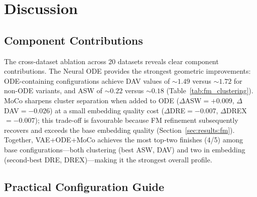 \documentclass[journal]{IEEEtran}
\begin{document}
\section{Discussion}
\label{sec:discussion}

\subsection{Component Contributions}
\label{sec:discussion:components}

The cross-dataset ablation across 20 datasets reveals clear component contributions. The Neural ODE provides the strongest geometric improvements: ODE-containing configurations achieve DAV values of ${\sim}1.49$ versus ${\sim}1.72$ for non-ODE variants, and ASW of ${\sim}0.22$ versus ${\sim}0.18$ (Table~\ref{tab:fm_clustering}). MoCo sharpens cluster separation when added to ODE ($\Delta$ASW$=+0.009$, $\Delta$DAV$=-0.026$) at a small embedding quality cost ($\Delta$DRE$=-0.007$, $\Delta$DREX$=-0.007$); this trade-off is favourable because FM refinement subsequently recovers and exceeds the base embedding quality (Section~\ref{sec:results:fm}). Together, VAE+ODE+MoCo achieves the most top-two finishes (4/5) among base configurations---both clustering (best ASW, DAV) and two in embedding (second-best DRE, DREX)---making it the strongest overall profile.

\subsection{Practical Configuration Guide}
\label{sec:discussion:guide}
\end{document}
